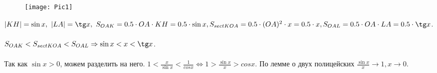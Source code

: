 		\begin{figure}[htpb]
			\centering
			\texttt{[image: Pic1]}
		\end{figure}
		
		$|KH| = \sin x,\ |LA| = \tg x,\ S_{OAK} = 0.5 \cdot OA \cdot KH = 0.5 \cdot \sin x, S_{sectKOA} = 0.5 \cdot (OA)^2 \cdot x = 0.5 \cdot x, S_{OAL} = 0.5 \cdot OA \cdot LA = 0.5 \cdot \tg x$. \\
		\\
		$S_{OAK} < S_{sectKOA} < S_{OAL} \Rightarrow \sin x < x < \tg x$. \\
		\\
		Так как $\sin x > 0$, можем разделить на него. $1 < \frac{x}{\sin x} < \frac{1}{cosx} \Leftrightarrow 1 > \frac{\sin x}{x} > cosx$. По лемме о двух полицейских $\frac{\sin x}{x} \rightarrow 1, x \rightarrow 0$. \\
		
